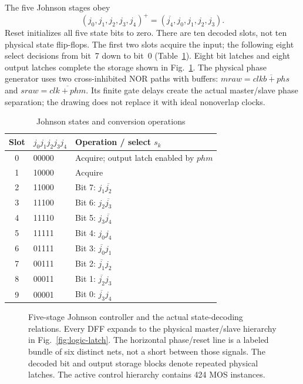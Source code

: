 The five Johnson stages obey
\begin{equation}
(j_0,j_1,j_2,j_3,j_4)^+
  =(\overline{j_4},j_0,j_1,j_2,j_3).
\end{equation}
Reset initializes all five state bits to zero. There are ten decoded slots,
not ten physical state flip-flops. The first two slots acquire the input;
the following eight select decisions from bit~7 down to bit~0
(Table~\ref{tab:johnson-slots}). Eight bit latches and eight output latches
complete the storage shown in Fig.~\ref{fig:controller}.
The physical phase generator uses two cross-inhibited NOR paths with
buffers: $mraw=\overline{clkb+phs}$ and
$sraw=\overline{clk+phm}$. Its finite gate delays create the actual
master/slave phase separation; the drawing does not replace it with ideal
nonoverlap clocks.

\begin{table}[!t]\centering
\caption{Johnson states and conversion operations}
\label{tab:johnson-slots}
\begin{tabular}{cll}\toprule
Slot & $j_0j_1j_2j_3j_4$ & Operation / select $s_k$\\\midrule
0 & 00000 & Acquire; output latch enabled by $phm$\\
1 & 10000 & Acquire\\
2 & 11000 & Bit 7: $j_1\overline{j_2}$\\
3 & 11100 & Bit 6: $j_2\overline{j_3}$\\
4 & 11110 & Bit 5: $j_3\overline{j_4}$\\
5 & 11111 & Bit 4: $j_0j_4$\\
6 & 01111 & Bit 3: $\overline{j_0}j_1$\\
7 & 00111 & Bit 2: $\overline{j_1}j_2$\\
8 & 00011 & Bit 1: $\overline{j_2}j_3$\\
9 & 00001 & Bit 0: $\overline{j_3}j_4$\\\bottomrule
\end{tabular}
\end{table}

\begin{figure}[!t]
\centering
\resizebox{.97\textwidth}{!}{}
\caption{Five-stage Johnson controller and the actual state-decoding relations.
Every DFF expands to the physical master/slave hierarchy in
Fig.~\ref{fig:logic-latch}. The horizontal phase/reset line is a labeled bundle
of six distinct nets, not a short between those signals. The decoded bit and
output storage blocks denote repeated physical latches. The active control
hierarchy contains 424 MOS instances.}
\label{fig:controller}
\end{figure}
